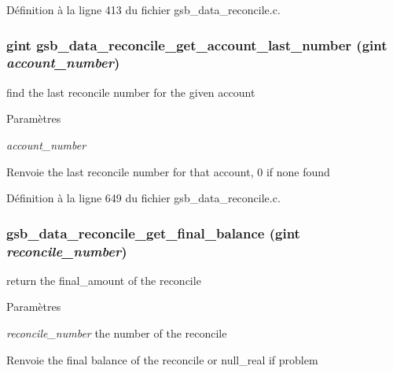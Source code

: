 Définition à la ligne 413 du fichier gsb\_\-data\_\-reconcile.c.

\subsubsection[{gsb\_\-data\_\-reconcile\_\-get\_\-account\_\-last\_\-number}]{\setlength{\rightskip}{0pt plus 5cm}gint gsb\_\-data\_\-reconcile\_\-get\_\-account\_\-last\_\-number (gint {\em account\_\-number})}\label{gsb__data__reconcile_8h_a2ab9538da63a10bec22e1efe1cd3f19f}
find the last reconcile number for the given account


\begin{DoxyParams}{Paramètres}
\item[{\em account\_\-number}]\end{DoxyParams}
\begin{DoxyReturn}{Renvoie}
the last reconcile number for that account, 0 if none found 
\end{DoxyReturn}


Définition à la ligne 649 du fichier gsb\_\-data\_\-reconcile.c.

\subsubsection[{gsb\_\-data\_\-reconcile\_\-get\_\-final\_\-balance}]{ gsb\_\-data\_\-reconcile\_\-get\_\-final\_\-balance (gint {\em reconcile\_\-number})}\label{gsb__data__reconcile_8h_a261a4e1eacb9c6517df7daa4afa879bb}
return the final\_\-amount of the reconcile


\begin{DoxyParams}{Paramètres}
\item[{\em reconcile\_\-number}]the number of the reconcile\end{DoxyParams}
\begin{DoxyReturn}{Renvoie}
the final balance of the reconcile or null\_\-real if problem 
\end{DoxyReturn}


